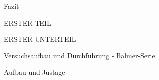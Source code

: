 \documentclass[pdftex, a4paper,11pt, twoside, ngerman]{report}
\begin{document}
  \begin{chapter}{Fazit}
    \label{chp:Fazit}
    
    
    
    \begin{section}{ERSTER TEIL}
      \label{chp:Fazit:sec:ERSTERTEIL}
      
      
      
      \begin{subsection}{ERSTER UNTERTEIL}
        \label{chp:Fazit:sec:ERSTERTEIL:subsec:UNTERTEIL}
       
       
       
      \end{subsection}
      
      
    \end{section}
    
  \end{chapter}
  
  \begin{chapter}{Versuchsaufbau und Durchführung - Balmer-Serie}

      \begin{section}{Aufbau und Justage}


      \end{section}

  \end{chapter}
  
\end{document}
